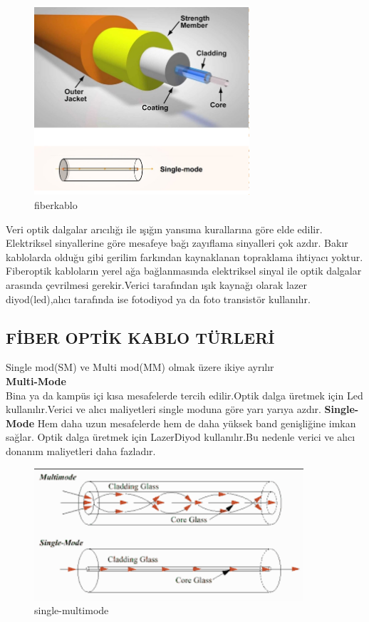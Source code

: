 \begin{figure}[H]
    \centering
    \includegraphics[width=8cm]{images/fiberoptik}
    \caption{fiberkablo}
    \label{fig:fiberoptikkablo}
\end{figure}

 Veri optik dalgalar arıcılığı ile ışığın yansıma kurallarına göre elde edilir.
 Elektriksel sinyallerine göre mesafeye bağı zayıflama sinyalleri çok azdır.
 Bakır kablolarda olduğu gibi gerilim farkından kaynaklanan topraklama ihtiyacı yoktur.
 Fiberoptik kabloların yerel ağa bağlanmasında elektriksel sinyal ile optik dalgalar arasında çevrilmesi gerekir.Verici tarafından ışık kaynağı olarak lazer diyod(led),alıcı tarafında ise fotodiyod ya da foto transistör kullanılır.
\subsection{FİBER OPTİK KABLO TÜRLERİ}
Single mod(SM) ve Multi mod(MM) olmak üzere ikiye ayrılır\\
\textbf{Multi-Mode}\\
Bina ya da kampüs içi kısa mesafelerde tercih edilir.Optik dalga üretmek için Led kullanılır.Verici ve alıcı maliyetleri single moduna göre yarı yarıya azdır.
\textbf{Single-Mode}
Hem daha uzun mesafelerde hem de daha yüksek band genişliğine imkan sağlar.
Optik dalga üretmek için LazerDiyod kullanılır.Bu nedenle verici ve alıcı donanım maliyetleri daha fazladır.

\begin{figure}[ht]
    \centering
    \includegraphics[width=10cm]{images/single-multimode}
    \caption{single-multimode}
    \label{fig:single_multi_mode}
\end{figure}
